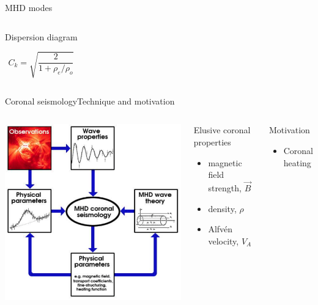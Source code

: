 \documentclass[11pt,table]{beamer}
\begin{document}
\begin{frame}{MHD modes}
\begin{columns}
\begin{block}{\centering Dispersion diagram}
\begin{figure}
        \end{figure}
        $$ C_k = \sqrt{\frac{2}{1+\rho_e/\rho_o}}  $$
    \end{block}
    \end{columns}
\end{frame}%
\begin{frame}{Coronal seismology}{Technique and motivation}
    \begin{columns}
        \includegraphics[width=\textwidth]{schematic.png}
        \begin{block}{Elusive coronal properties}
            \begin{itemize}
                \item magnetic field strength, $\vec{B}$
                \item density, $\rho$
                \item Alfv\'en velocity, $V_A$
            \end{itemize}
        \end{block}
        \begin{block}{Motivation}
            \begin{itemize}
                \item Coronal heating

\end{itemize}
\end{block}
\end{columns}
\end{frame}
\end{document}
